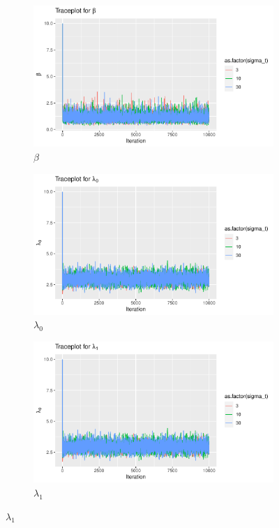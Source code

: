 \begin{figure}[H]
    \centering
    \begin{subfigure}[b]{0.49\textwidth}
        \centering
        \includegraphics[width = \textwidth]{Images/tuning_beta_block.pdf}
        \caption{$\beta$}

    \end{subfigure}
    \begin{subfigure}[b]{0.49\textwidth}
        \centering
        \includegraphics[width = \textwidth]{Images/tuning_lambda_0_block.pdf}
        \caption{$\lambda_0$}

    \end{subfigure}
    \begin{subfigure}[b]{0.49\textwidth}
        \centering
        \includegraphics[width = \textwidth]{Images/tuning_lambda_1_block.pdf}
        \caption{$\lambda_1$}


\end{subfigure}
\end{figure}
